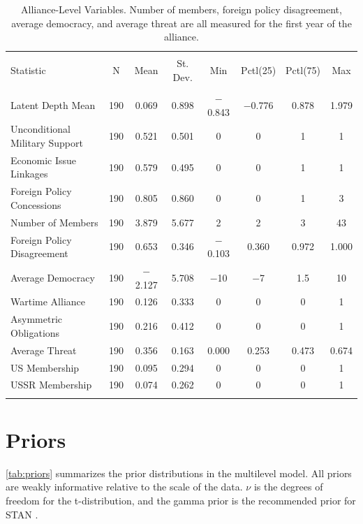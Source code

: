 \documentclass[12pt]{article}
\begin{document}
\begin{table}[!htbp] \centering 
  \caption{Alliance-Level Variables. Number of members, foreign policy disagreement, average democracy, and average threat are all measured for the first year of the alliance.} 
  \label{tab:all-level-sum} 
\begin{tabular}{@{\extracolsep{5pt}}lccccccc} 
\\[-1.8ex]\hline 
\hline \\[-1.8ex] 
Statistic & \multicolumn{1}{c}{N} & \multicolumn{1}{c}{Mean} & \multicolumn{1}{c}{St. Dev.} & \multicolumn{1}{c}{Min} & \multicolumn{1}{c}{Pctl(25)} & \multicolumn{1}{c}{Pctl(75)} & \multicolumn{1}{c}{Max} \\ 
\hline \\[-1.8ex] 
Latent Depth Mean & 190 & 0.069 & 0.898 & $-$0.843 & $-$0.776 & 0.878 & 1.979 \\ 
Unconditional Military Support & 190 & 0.521 & 0.501 & 0 & 0 & 1 & 1 \\ 
Economic Issue Linkages & 190 & 0.579 & 0.495 & 0 & 0 & 1 & 1 \\ 
Foreign Policy Concessions & 190 & 0.805 & 0.860 & 0 & 0 & 1 & 3 \\ 
Number of Members& 190 & 3.879 & 5.677 & 2 & 2 & 3 & 43 \\ 
Foreign Policy Disagreement & 190 & 0.653 & 0.346 & $-$0.103 & 0.360 & 0.972 & 1.000 \\ 
Average Democracy & 190 & $-$2.127 & 5.708 & $-$10 & $-$7 & 1.5 & 10 \\ 
Wartime Alliance & 190 & 0.126 & 0.333 & 0 & 0 & 0 & 1 \\ 
Asymmetric Obligations & 190 & 0.216 & 0.412 & 0 & 0 & 0 & 1 \\ 
Average Threat & 190 & 0.356 & 0.163 & 0.000 & 0.253 & 0.473 & 0.674 \\ 
US Membership & 190 & 0.095 & 0.294 & 0 & 0 & 0 & 1 \\ 
USSR Membership & 190 & 0.074 & 0.262 & 0 & 0 & 0 & 1 \\ 
\hline \\[-1.8ex] 
\end{tabular} 
\end{table} 



\section{Priors}

\autoref{tab:priors} summarizes the prior distributions in the multilevel model. 
All priors are weakly informative relative to the scale of the data. 
$\nu$ is the degrees of freedom for the t-distribution, and the gamma prior is the recommended prior for STAN \citep{JuarezSteele2010}. 
\end{document}
